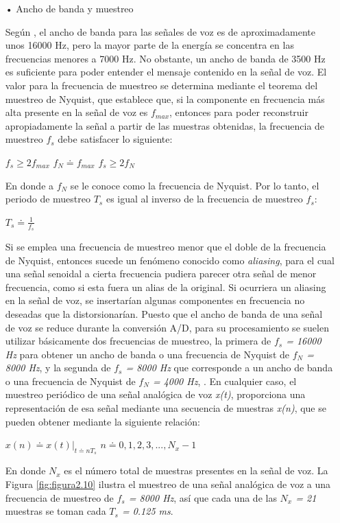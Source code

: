 \begin{enumerate}
\begin{enumerate}
\item[•]Ancho de banda y muestreo
\par
Según \cite{claudio}, el ancho de banda para las señales de voz es de aproximadamente unos 16000 Hz, pero la mayor parte de la energía se concentra en las frecuencias menores a 7000 Hz. No obstante, un ancho de banda de 3500 Hz es suficiente para poder entender el mensaje contenido en la señal de voz.
\vskip 0.5cm
El valor para la frecuencia de muestreo se determina mediante el teorema del muestreo de Nyquist, que establece que, si la componente en frecuencia más alta presente en la señal de voz es \textit{$f_{max}$}, entonces para poder reconstruir apropiadamente la señal a partir de las muestras obtenidas, la frecuencia de muestreo \textit{$f_{s}$} debe satisfacer lo siguiente:
\begin{center}
$f_{s} \geq 2f_{max}$ \hspace{1cm} $f_{N} \doteq f_{max}$ \hspace{1cm} $f_{s} \geq 2f_{N}$
\end{center}
En donde a $f_{N}$ se le conoce como la frecuencia de Nyquist. Por lo tanto, el periodo de muestreo $T_{s}$ es igual al inverso de la frecuencia de muestreo \textit{$f_{s}$}:
\begin{center}
$T_{s} \doteq \frac{1}{f_{s}}$
\end{center}
Si se emplea una frecuencia de muestreo menor que el doble de la frecuencia de Nyquist, entonces sucede un fenómeno conocido como \textit{aliasing}, para el cual una señal senoidal a cierta frecuencia pudiera parecer otra señal de menor frecuencia, como si esta fuera un alias de la original. Si ocurriera un aliasing en la señal de voz, se insertarían algunas componentes en frecuencia no deseadas que la distorsionarían.
\vskip 0.5cm
Puesto que el ancho de banda de una señal de voz se reduce durante la conversión A/D, para su procesamiento se suelen utilizar básicamente dos frecuencias de muestreo, la primera de \textit{$f_{s}$ = 16000 Hz} para obtener un ancho de banda o una frecuencia de Nyquist de \textit{$f_{N}$ = 8000 Hz}, y la segunda de \textit{$f_{s}$ = 8000 Hz} que corresponde a un ancho de banda o una frecuencia de Nyquist de \textit{$f_{N}$ = 4000 Hz}, \cite{herrera}.
\vskip 0.5cm
En cualquier caso, el muestreo periódico de una señal analógica de voz \textit{x(t)}, proporciona una representación de esa señal mediante una secuencia de muestras \textit{x(n)}, que se pueden obtener mediante la siguiente relación:
\begin{center}
$x(n) \doteq x(t) \textbf{|}_{t \doteq nT_{s}}$ \hspace{1cm} $n \doteq 0,1,2,3,...,N_{x} - 1$
\end{center}
En donde $N_{x}$ es el número total de muestras presentes en la señal de voz. La Figura \ref{fig:figura2.10} ilustra el muestreo de una señal analógica de voz a una frecuencia de muestreo de \textit{$f_{s}$ = 8000 Hz}, así que cada una de las \textit{$N_{x}$ = 21} muestras se toman cada \textit{$T_{s}$ = 0.125 ms}.


\end{enumerate}
\end{enumerate}
